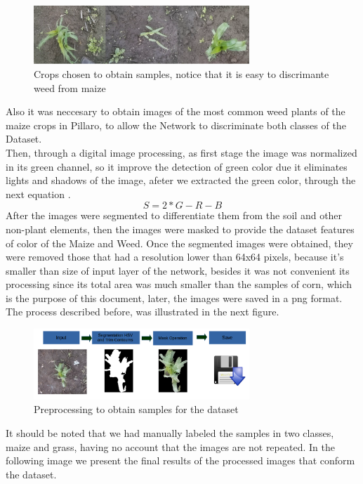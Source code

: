 \documentclass[conference]{IEEEtran}
\begin{document}
	\begin{figure}[h]
	\centering
	\includegraphics[width=3.2in]{entradamaiz}
	\caption{Crops chosen to obtain samples, notice that it is easy to discrimante weed from maize}
	\label{fig_sim}
	\end{figure}

Also it was neccesary  to obtain images of the most common weed plants of the maize crops in Pillaro, to allow the Network to discriminate both classes of the Dataset. \\
	
Then, through a digital image processing, as first stage the image was normalized in its green channel, so it improve the detection of green color due it eliminates lights and shadows of the image, afeter we extracted the green color, through the next equation \cite{wang2013path}. 
\begin{equation}
	S = 2*G - R - B
\end{equation} 
After the images were segmented to differentiate them from the soil and other non-plant elements, then the images were masked to provide the dataset features of color of the Maize and Weed. Once the segmented images were obtained, they were removed those that had a resolution lower than 64x64 pixels, because it's smaller than size of input layer of the network, besides it was not convenient its processing since its total area was much smaller than the samples of corn, which is the purpose of this document, later, the images were saved in a png format. The process described before, was illustrated in the next figure. \\
	\begin{figure}[h]
	\centering
	\includegraphics[width=3.2in]{procesamiento}
	\caption{Preprocessing to obtain samples for the dataset}
	\label{fig_sim}
	\end{figure}
	
It should be noted that we had manually labeled the samples in two classes, maize and grass, having no account that the images are not repeated. In the following image we present the final results of the processed images that conform the dataset.\\
	
\end{document}
